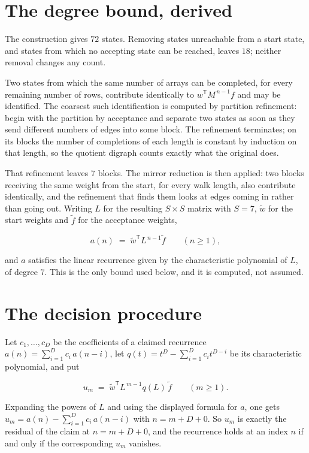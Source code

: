 \documentclass[11pt]{article}
\theoremstyle{definition}
\begin{document}
\section{The degree bound, derived}

The construction gives $72$ states. Removing states unreachable from a start state, and states from which no accepting state can be reached, leaves $18$; neither removal changes any count.

Two states from which the same number of arrays can be completed, for every remaining number of rows, contribute identically to $w^{\mathsf T}M^{\,n-1}f$ and may be identified. The coarsest such identification is computed by partition refinement: begin with the partition by acceptance and separate two states as soon as they send different numbers of edges into some block. The refinement terminates; on its blocks the number of completions of each length is constant by induction on that length, so the quotient digraph counts exactly what the original does.

That refinement leaves $7$ blocks. The mirror reduction is then applied: two blocks receiving the same weight from the start, for every walk length, also contribute identically, and the refinement that finds them looks at edges coming in rather than going out. Writing $L$ for the resulting $S \times S$ matrix with $S = 7$, $\tilde w$ for the start weights and $\tilde f$ for the acceptance weights,

\[a(n) \;=\; \tilde w^{\mathsf T} L^{\,n-1} \tilde f \qquad (n \ge 1),\]

and $a$ satisfies the linear recurrence given by the characteristic polynomial of $L$, of degree $7$. This is the only bound used below, and it is computed, not assumed.

\section{The decision procedure}

Let $c_1,\dots,c_D$ be the coefficients of a claimed recurrence $a(n) = \sum_{i=1}^{D} c_i\,a(n-i)$, let $q(t) = t^{D} - \sum_{i=1}^{D} c_i t^{D-i}$ be its characteristic polynomial, and put

\[u_m \;=\; \tilde w^{\mathsf T} L^{\,m-1} q(L)\,\tilde f \qquad (m \ge 1).\]

Expanding the powers of $L$ and using the displayed formula for $a$, one gets $u_m = a(n) - \sum_{i=1}^{D} c_i\,a(n-i)$ with $n = m + D + 0$. So $u_m$ is exactly the residual of the claim at $n = m + D + 0$, and the recurrence holds at an index $n$ if and only if the corresponding $u_m$ vanishes.
\end{document}
